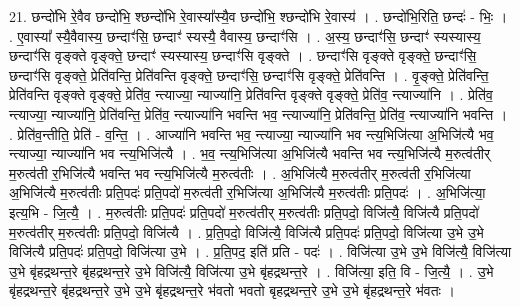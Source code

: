 \documentclass[17pt]{extarticle}
\begin{document}
21. छन्दो॑भि रे॒वैव छन्दो॑भि॒ श्छन्दो॑भि रे॒वास्या᳚स्यै॒व छन्दो॑भि॒ श्छन्दो॑भि रे॒वास्य॑ । . छन्दो॑भि॒रिति॒ छन्दः॑ - भिः॒ । . ए॒वास्या᳚ स्यै॒वैवास्य॒ छन्दाꣳ॑सि॒ छन्दाꣳ॑ स्यस्यै॒ वैवास्य॒ छन्दाꣳ॑सि । . अ॒स्य॒ छन्दाꣳ॑सि॒ छन्दाꣳ॑ स्यस्यास्य॒ छन्दाꣳ॑सि वृङ्क्ते वृङ्क्ते॒ छन्दाꣳ॑ स्यस्यास्य॒ छन्दाꣳ॑सि वृङ्क्ते । . छन्दाꣳ॑सि वृङ्क्ते वृङ्क्ते॒ छन्दाꣳ॑सि॒ छन्दाꣳ॑सि वृङ्क्ते॒ प्रेति॑वन्ति॒ प्रेति॑वन्ति वृङ्क्ते॒ छन्दाꣳ॑सि॒ छन्दाꣳ॑सि वृङ्क्ते॒ प्रेति॑वन्ति । . वृ॒ङ्क्ते॒ प्रेति॑वन्ति॒ प्रेति॑वन्ति वृङ्क्ते वृङ्क्ते॒ प्रेति॑व॒ न्त्याज्या॒ न्याज्या॑नि॒ प्रेति॑वन्ति वृङ्क्ते वृङ्क्ते॒ प्रेति॑व॒ न्त्याज्या॑नि । . प्रेति॑व॒ न्त्याज्या॒ न्याज्या॑नि॒ प्रेति॑वन्ति॒ प्रेति॑व॒ न्त्याज्या॑नि भवन्ति भव॒ न्त्याज्या॑नि॒ प्रेति॑वन्ति॒ प्रेति॑व॒ न्त्याज्या॑नि भवन्ति । . प्रेति॑व॒न्तीति॒ प्रेति॑ - व॒न्ति॒ । . आज्या॑नि भवन्ति भव॒ न्त्याज्या॒ न्याज्या॑नि भव न्त्य॒भिजि॑त्या अ॒भिजि॑त्यै भव॒ न्त्याज्या॒ न्याज्या॑नि भव न्त्य॒भिजि॑त्यै । . भ॒व॒ न्त्य॒भिजि॑त्या अ॒भिजि॑त्यै भवन्ति भव न्त्य॒भिजि॑त्यै म॒रुत्व॑तीर् म॒रुत्व॑ती र॒भिजि॑त्यै भवन्ति भव न्त्य॒भिजि॑त्यै म॒रुत्व॑तीः । . अ॒भिजि॑त्यै म॒रुत्व॑तीर् म॒रुत्व॑ती र॒भिजि॑त्या अ॒भिजि॑त्यै म॒रुत्व॑तीः प्रति॒पदः॑ प्रति॒पदो॑ म॒रुत्व॑ती र॒भिजि॑त्या अ॒भिजि॑त्यै म॒रुत्व॑तीः प्रति॒पदः॑ । . अ॒भिजि॑त्या॒ इत्य॒भि - जि॒त्यै॒ । . म॒रुत्व॑तीः प्रति॒पदः॑ प्रति॒पदो॑ म॒रुत्व॑तीर् म॒रुत्व॑तीः प्रति॒पदो॒ विजि॑त्यै॒ विजि॑त्यै प्रति॒पदो॑ म॒रुत्व॑तीर् म॒रुत्व॑तीः प्रति॒पदो॒ विजि॑त्यै । . प्र॒ति॒पदो॒ विजि॑त्यै॒ विजि॑त्यै प्रति॒पदः॑ प्रति॒पदो॒ विजि॑त्या उ॒भे उ॒भे विजि॑त्यै प्रति॒पदः॑ प्रति॒पदो॒ विजि॑त्या उ॒भे । . प्र॒ति॒पद॒ इति॑ प्रति - पदः॑ । . विजि॑त्या उ॒भे उ॒भे विजि॑त्यै॒ विजि॑त्या उ॒भे बृ॑हद्रथन्त॒रे बृ॑हद्रथन्त॒रे उ॒भे विजि॑त्यै॒ विजि॑त्या उ॒भे बृ॑हद्रथन्त॒रे । . विजि॑त्या॒ इति॒ वि - जि॒त्यै॒ । . उ॒भे बृ॑हद्रथन्त॒रे बृ॑हद्रथन्त॒रे उ॒भे उ॒भे बृ॑हद्रथन्त॒रे भ॑वतो भवतो बृहद्रथन्त॒रे उ॒भे उ॒भे बृ॑हद्रथन्त॒रे भ॑वतः । \newline
\end{document}
